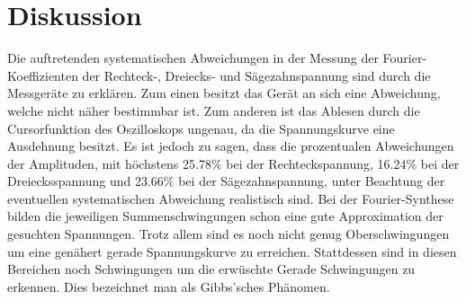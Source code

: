 \section{Diskussion}
\label{sec:Diskussion}

Die auftretenden systematischen Abweichungen in der Messung der Fourier-Koeffizienten
der Rechteck-, Dreiecks- und Sägezahnspannung sind durch die Messgeräte zu erklären.
Zum einen besitzt das Gerät an sich eine Abweichung, welche nicht näher bestimmbar ist.
Zum anderen ist das Ablesen durch die Cursorfunktion des Oszilloskops ungenau, da die
Spannungskurve eine Ausdehnung besitzt.
Es ist jedoch zu sagen, dass die prozentualen Abweichungen der Amplituden,  mit höchstens
25.78$\si{\percent}$ bei der Rechteckspannung, 16.24$\si{\percent}$ bei der Dreiecksspannung
und 23.66$\si{\percent}$ bei der Sägezahnspannung, unter Beachtung der eventuellen systematischen
Abweichung realistisch sind.
Bei der Fourier-Synthese bilden die jeweiligen Summenschwingungen schon eine gute
Approximation der gesuchten Spannungen. Trotz allem sind es noch nicht genug Oberschwingungen um
eine genähert gerade Spannungskurve zu erreichen. Stattdessen sind in diesen Bereichen noch Schwingungen
um die erwüschte Gerade Schwingungen zu erkennen. Dies bezeichnet man als Gibbs'sches Phänomen.
